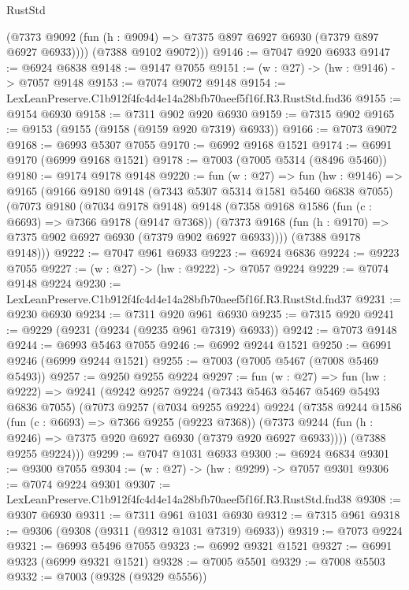 \begin{lexlean}{RustStd}
\begin{coremodule}
          (@7373 @9092 (fun (h : @9094) => @7375 @897 @6927 @6930 (@7379 @897 @6927 @6933))))
        (@7388 @9102 @9072)))
@9146 := @7047 @920 @6933
@9147 := @6924 @6838
@9148 := @9147 @7055
@9151 := (w : @27) -> (hw : @9146) -> @7057 @9148
@9153 := @7074 @9072 @9148
@9154 := LexLeanPreserve.C1b912f4fc4d4e14a28bfb70aeef5f16f.R3.RustStd.fnd36
@9155 := @9154 @6930
@9158 := @7311 @902 @920 @6930
@9159 := @7315 @902
@9165 := @9153 (@9155 (@9158 (@9159 @920 @7319) @6933))
@9166 := @7073 @9072
@9168 := @6993 @5307 @7055
@9170 := @6992 @9168 @1521
@9174 := @6991 @9170 (@6999 @9168 @1521)
@9178 := @7003 (@7005 @5314 (@8496 @5460))
@9180 := @9174 @9178 @9148
@9220 := fun (w : @27) =>
  fun (hw : @9146) =>
  @9165
    (@9166
      @9180
      @9148
      (@7343 @5307 @5314 @1581 @5460 @6838 @7055)
      (@7073
        @9180
        (@7034 @9178 @9148)
        @9148
        (@7358
          @9168
          @1586
          (fun (c : @6693) => @7366 @9178 (@9147 @7368))
          (@7373 @9168 (fun (h : @9170) => @7375 @902 @6927 @6930 (@7379 @902 @6927 @6933))))
        (@7388 @9178 @9148)))
@9222 := @7047 @961 @6933
@9223 := @6924 @6836
@9224 := @9223 @7055
@9227 := (w : @27) -> (hw : @9222) -> @7057 @9224
@9229 := @7074 @9148 @9224
@9230 := LexLeanPreserve.C1b912f4fc4d4e14a28bfb70aeef5f16f.R3.RustStd.fnd37
@9231 := @9230 @6930
@9234 := @7311 @920 @961 @6930
@9235 := @7315 @920
@9241 := @9229 (@9231 (@9234 (@9235 @961 @7319) @6933))
@9242 := @7073 @9148
@9244 := @6993 @5463 @7055
@9246 := @6992 @9244 @1521
@9250 := @6991 @9246 (@6999 @9244 @1521)
@9255 := @7003 (@7005 @5467 (@7008 @5469 @5493))
@9257 := @9250 @9255 @9224
@9297 := fun (w : @27) =>
  fun (hw : @9222) =>
  @9241
    (@9242
      @9257
      @9224
      (@7343 @5463 @5467 @5469 @5493 @6836 @7055)
      (@7073
        @9257
        (@7034 @9255 @9224)
        @9224
        (@7358
          @9244
          @1586
          (fun (c : @6693) => @7366 @9255 (@9223 @7368))
          (@7373 @9244 (fun (h : @9246) => @7375 @920 @6927 @6930 (@7379 @920 @6927 @6933))))
        (@7388 @9255 @9224)))
@9299 := @7047 @1031 @6933
@9300 := @6924 @6834
@9301 := @9300 @7055
@9304 := (w : @27) -> (hw : @9299) -> @7057 @9301
@9306 := @7074 @9224 @9301
@9307 := LexLeanPreserve.C1b912f4fc4d4e14a28bfb70aeef5f16f.R3.RustStd.fnd38
@9308 := @9307 @6930
@9311 := @7311 @961 @1031 @6930
@9312 := @7315 @961
@9318 := @9306 (@9308 (@9311 (@9312 @1031 @7319) @6933))
@9319 := @7073 @9224
@9321 := @6993 @5496 @7055
@9323 := @6992 @9321 @1521
@9327 := @6991 @9323 (@6999 @9321 @1521)
@9328 := @7005 @5501
@9329 := @7008 @5503
@9332 := @7003 (@9328 (@9329 @5556))

\end{coremodule}
\end{lexlean}
